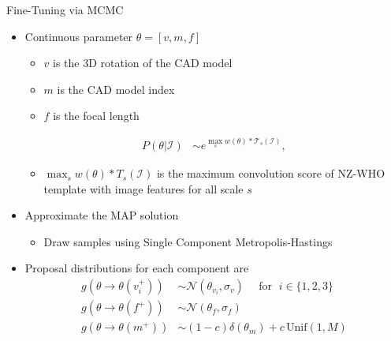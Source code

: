 \documentclass[serif,mathserif,final]{beamer}
\newcommand{\1}{\mathbb{I}} %
\begin{document}
\begin{frame}{}
\begin{columns}[t]
    \begin{column}{0.23\linewidth}


      \begin{block}{Fine-Tuning via MCMC}
        \begin{itemize}
          \item Continuous parameter $\theta = [v, m, f]$
            \begin{itemize}
              \item $v$ is the 3D rotation of the CAD model
              \item $m$ is the CAD model index
              \item $f$ is the focal length
            \end{itemize}
            \begin{align}
                P(\theta| \mathcal{I}) & \sim e^{ \max_{s} w(\theta) \ast
                  \mathcal{T}_s(\mathcal{I})},
            \end{align}
            \begin{itemize}
              \item $\max_{s} w(\theta) \ast T_s(\mathcal{I})$ is the maximum
                convolution score of NZ-WHO template with image features for
                all scale $s$
            \end{itemize}
          \item Approximate the MAP solution
            \begin{itemize}
              \item Draw samples using Single Component Metropolis-Hastings
            \end{itemize}
          \item Proposal distributions for each component are
            \begin{align}
                g(\theta \rightarrow \theta(v_i^+)) & \sim
                \mathcal{N}(\theta_{v_i},\sigma_v) \quad \mbox{ for }\; i \in \{1,2,3\}\\
                g(\theta \rightarrow \theta(f^+)) & \sim \mathcal{N}(\theta_{f}, \sigma_f)\\
                g(\theta \rightarrow \theta(m^+)) & \sim (1-c) \delta(\theta_m) +
                c\,\textrm{Unif}(1,M)
            \end{align}
        \end{itemize}
      \end{block}



\end{column}
\end{columns}
\end{frame}
\end{document}
